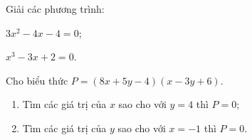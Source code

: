 {\begin{bt}
{		
	}
\end{bt}

\begin{bt}%
	Giải các phương trình:
	\begin{listEX}[2]
		\item $3 x^2 - 4 x - 4 = 0$;
		\item $x^3 - 3 x + 2 = 0$.
	\end{listEX}
	
\end{bt}
\begin{bt}%
	Cho biểu thức $P = (8x + 5y - 4)(x - 3y + 6)$.
		\begin{enumerate}
		\item Tìm các giá trị của $x$ sao cho với $y = 4$ thì $P = 0$;
		\item Tìm các giá trị của $y$ sao cho với $x = -1$ thì $P = 0$.
	\end{enumerate}
	

\end{bt}}
